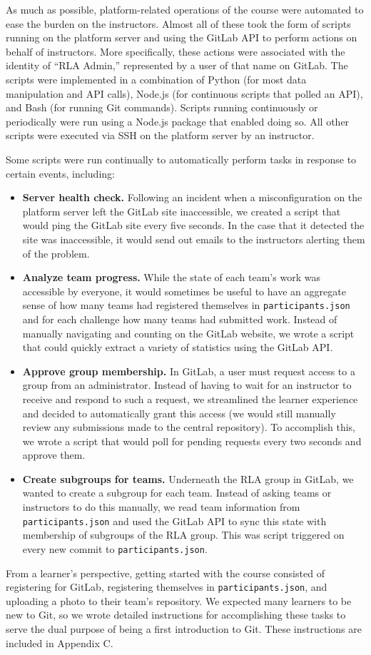 \documentclass[12pt,twoside]{mitthesis}
\newcommand{\review}[1]{{\color{mygreen} #1}}
\begin{document}
\review{As much as possible, platform-related operations of the course were automated to ease the burden on the instructors. Almost all of these took the form of scripts running on the platform server and using the GitLab API to perform actions on behalf of instructors. More specifically, these actions were associated with the identity of ``RLA Admin,'' represented by a user of that name on GitLab. The scripts were implemented in a combination of Python (for most data manipulation and API calls), Node.js (for continuous scripts that polled an API), and Bash (for running Git commands). Scripts running continuously or periodically were run using a Node.js package that enabled doing so. All other scripts were executed via SSH on the platform server by an instructor.

Some scripts were run continually to automatically perform tasks in response to certain events, including:
\begin{itemize}
\item \textbf{Server health check.} Following an incident when a misconfiguration on the platform server left the GitLab site inaccessible, we created a script that would ping the GitLab site every five seconds. In the case that it detected the site was inaccessible, it would send out emails to the instructors alerting them of the problem.
\item \textbf{Analyze team progress.} While the state of each team's work was accessible by everyone, it would sometimes be useful to have an aggregate sense of how many teams had registered themselves in \texttt{participants.json} and for each challenge how many teams had submitted work. Instead of manually navigating and counting on the GitLab website, we wrote a script that could quickly extract a variety of statistics using the GitLab API.
\item \textbf{Approve group membership.} In GitLab, a user must request access to a group from an administrator. Instead of having to wait for an instructor to receive and respond to such a request, we streamlined the learner experience and decided to automatically grant this access (we would still manually review any submissions made to the central repository). To accomplish this, we wrote a script that would poll for pending requests every two seconds and approve them. 
\item \textbf{Create subgroups for teams.} Underneath the RLA group in GitLab, we wanted to create a subgroup for each team. Instead of asking teams or instructors to do this manually, we read team information from \texttt{participants.json} and used the GitLab API to sync this state with membership of subgroups of the RLA group. This was script triggered on every new commit to \texttt{participants.json}.
\end{itemize}
From a learner's perspective, getting started with the course consisted of registering for GitLab, registering themselves in \texttt{participants.json}, and uploading a photo to their team's repository. We expected many learners to be new to Git, so we wrote detailed instructions for accomplishing these tasks to serve the dual purpose of being a first introduction to Git. These instructions are included in Appendix C.

}
\end{document}
